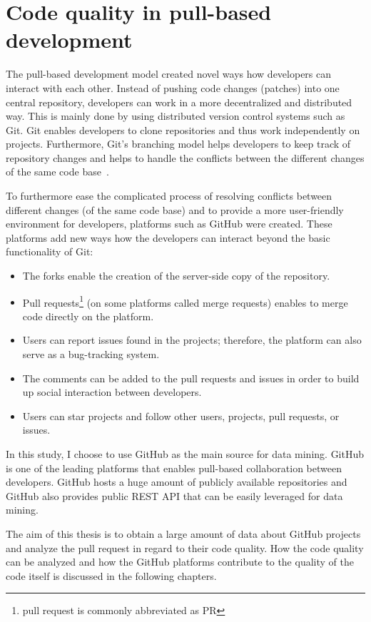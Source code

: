 \documentclass[digital,oneside,oldtable,nolof,nolot,nocover]{fithesis4}
\begin{document}
\chapter{Code quality in pull-based development}
\label{sec:org65ccf31}
The pull-based development model created novel ways how developers can
interact with each other. Instead of pushing code changes (patches) into
one central repository, developers can work in a more decentralized and
distributed way. This is mainly done by using distributed version control
systems such as Git. Git enables developers to clone repositories and thus
work independently on projects. Furthermore, Git's branching model helps
developers to keep track of repository changes and helps to handle the
conflicts between the different changes of the same code base~\cite{exploratory}.

To furthermore ease the complicated process of resolving conflicts between
different changes (of the same code base) and to provide a more user-friendly
environment for developers, platforms such as GitHub were created. These
platforms add new ways how the developers can interact beyond the basic
functionality of Git:
\begin{itemize}
\item The forks enable the creation of the server-side copy of the repository.
\item Pull requests\footnote{pull request is commonly abbreviated as PR}
(on some platforms called merge requests) enables to merge code directly on the platform.
\item Users can report issues found in the projects; therefore, the platform can also serve as a bug-tracking system.
\item The comments can be added to the pull requests and issues in order to build up social interaction between developers.
\item Users can star projects and follow other users, projects, pull requests, or issues.
\end{itemize}

In this study, I choose to use GitHub as the main source for data
mining. GitHub is one of the leading platforms that enables pull-based
collaboration between developers. GitHub hosts a huge amount of publicly
available repositories and GitHub also provides public REST API that can be
easily leveraged for data mining.

The aim of this thesis is to obtain a large amount of data about GitHub projects
and analyze the pull request in regard to their code quality. How the code
quality can be analyzed and how the GitHub platforms contribute to the quality of
the code itself is discussed in the following chapters.
\end{document}
